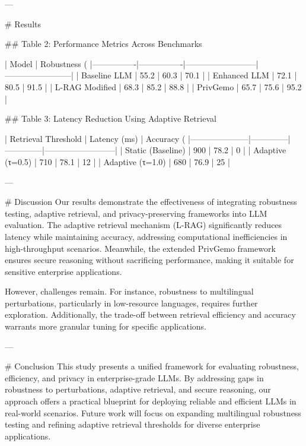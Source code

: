 ---

# Results  

## Table 2: Performance Metrics Across Benchmarks  

| Model          | Robustness (%
|----------------|----------------|--------------------------|------------------------|  
| Baseline LLM   | 55.2           | 60.3                    | 70.1                   |  
| Enhanced LLM   | 72.1           | 80.5                    | 91.5                   |  
| L-RAG Modified | 68.3           | 85.2                    | 88.8                   |  
| PrivGemo       | 65.7           | 75.6                    | 95.2                   |  

## Table 3: Latency Reduction Using Adaptive Retrieval  

| Retrieval Threshold | Latency (ms) | Accuracy (%
|---------------------|--------------|--------------|--------------------------|  
| Static (Baseline)   | 900          | 78.2         | 0                        |  
| Adaptive (τ=0.5)    | 710          | 78.1         | 12                       |  
| Adaptive (τ=1.0)    | 680          | 76.9         | 25                       |  

---

# Discussion  
Our results demonstrate the effectiveness of integrating robustness testing, adaptive retrieval, and privacy-preserving frameworks into LLM evaluation. The adaptive retrieval mechanism (L-RAG) significantly reduces latency while maintaining accuracy, addressing computational inefficiencies in high-throughput scenarios. Meanwhile, the extended PrivGemo framework ensures secure reasoning without sacrificing performance, making it suitable for sensitive enterprise applications.

However, challenges remain. For instance, robustness to multilingual perturbations, particularly in low-resource languages, requires further exploration. Additionally, the trade-off between retrieval efficiency and accuracy warrants more granular tuning for specific applications.

---

# Conclusion  
This study presents a unified framework for evaluating robustness, efficiency, and privacy in enterprise-grade LLMs. By addressing gaps in robustness to perturbations, adaptive retrieval, and secure reasoning, our approach offers a practical blueprint for deploying reliable and efficient LLMs in real-world scenarios. Future work will focus on expanding multilingual robustness testing and refining adaptive retrieval thresholds for diverse enterprise applications.


